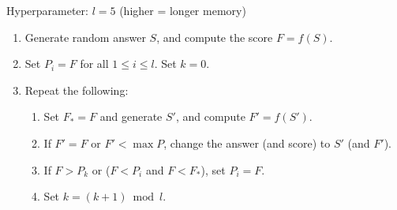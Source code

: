 Hyperparameter: $l = 5$ (higher = longer memory)
\begin{enumerate}
	\item Generate random answer $S$, and compute the score $F = f(S)$.
	\item Set $P_i = F$ for all $1 \le i \le l$. Set $k = 0$.
	\item Repeat the following:
	\begin{enumerate}
		\item Set $F_{*} = F$ and generate $S'$, and compute $F' = f(S')$.
		\item If $F' = F$ or $F' < \max P$, change the answer (and score) to $S'$ (and $F'$).
		\item If $F > P_k$ or ($F < P_i$ and $F < F_{*}$), set $P_i = F$.
		\item Set $k = (k+1) \bmod l$.
	\end{enumerate}
\end{enumerate}